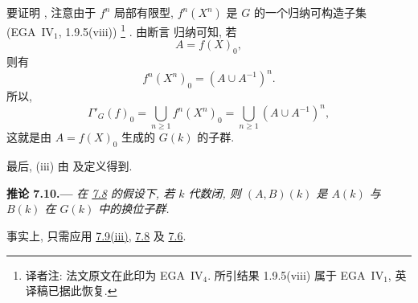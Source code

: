 要证明 \textup{},
注意由于 \(f^n\) 局部有限型, \(f^n(X^n)\)
是 \(G\) 的一个归纳可构造子集
(EGA~IV\(_1\), 1.9.5\textup{(viii)})\begingroup
\renewcommand{\thefootnote}{\fnsymbol{footnote}}%
\footnote[2]{\label{note:sga3-VIB-7.9-EGA-volume}
译者注: 法文原文在此印为 EGA~IV\(_4\).
所引结果 1.9.5\textup{(viii)} 属于 EGA~IV\(_1\),
英译稿已据此恢复.}%
\endgroup.
由断言 \textup{} 归纳可知, 若
\[
  A=f(X)_0,
\]
则有
\[
  f^n(X^n)_0=(A\cup A^{-1})^n.
\]
所以,
\label{form:sga3-VIB-7.9-generated-rational-points}%
\[
  \Gamma'_G(f)_0
    =\bigcup_{n\geq1}f^n(X^n)_0
    =\bigcup_{n\geq1}(A\cup A^{-1})^n,
\]
这就是由 \(A=f(X)_0\) 生成的 \(G(k)\) 的子群.

最后, \textup{(iii)} 由 \textup{}
及定义得到.

\medskip
{}\label{cor:sga3-VIB-7.10}%
\noindent\textbf{推论 7.10.---}%
\emph{在 \hyperref[prop:sga3-VIB-7.8]{7.8} 的假设下,
若 \(k\) 代数闭, 则 \((A,B)(k)\) 是 \(A(k)\)
与 \(B(k)\) 在 \(G(k)\) 中的换位子群.}

事实上, 只需应用 \hyperref[concl:sga3-VIB-7.9-iii]{7.9\textup{(iii)}},
\hyperref[prop:sga3-VIB-7.8]{7.8} 及 \hyperref[prop:sga3-VIB-7.6]{7.6}.

